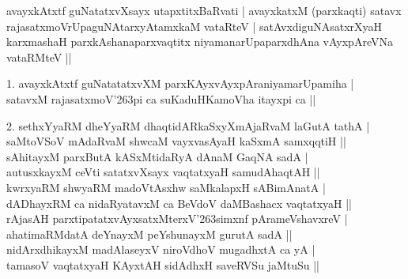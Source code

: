 \begin{entry}
\smallskip
\begin{shl}
avayxkAtxtf guNatatxvXsayx utapxtitxBaRvati | avayxkatxM (parxkaqti) satavx\\[1pt]
rajasatxmoVrUpaguNAtarxyAtamxkaM vataRteV | satAvxdiguNAsatxrXyaH\\[1pt]
karxmashaH parxkAshanaparxvaqtitx niyamanarUpaparxdhAna vAyxpAreVNa vataRMteV ||
\end{shl}
\smallskip
\begin{shl}
1. avayxkAtxtf guNatatatxvXM parxKAyxvAyxpAraniyamarUpamiha |\\[1pt]
satavxM rajasatxmoV\char'263pi ca suKaduHKamoVha itayxpi ca ||
\end{shl}
\medskip
{}
\smallskip
\begin{shl}
2. sethxYyaRM dheYyaRM dhaqtidARkaSxyXmAjaRvaM laGutA tathA |\\[2pt]
saMtoVSoV mAdaRvaM shwcaM vayxvasAyaH kaSxmA samxqqtiH ||\\[2pt]
sAhitayxM parxButA kASxMtidaRyA dAnaM GaqNA sadA |\\[2pt]
autusxkayxM ceVti satatxvXsayx vaqtatxyaH samudAhaqtAH ||\\[2pt]
kwrxyaRM shwyaRM madoVtAsxhw saMkalapxH sABimAnatA |\\[2pt]
dADhayxRM ca nidaRyatavxM ca BeVdoV daMBashacx vaqtatxyaH ||\\[2pt]
rAjasAH parxtipatatxvAyxsatxMterxV\char'263simxnf pArameVshavxreV |\\[2pt]
ahatimaRMdatA deYnayxM peYshunayxM gurutA sadA ||\\[2pt]
nidArxdhikayxM madAlaseyxV niroVdhoV mugadhxtA ca yA |\\[2pt]
tamasoV vaqtatxyaH KAyxtAH sidAdhxH saveRVSu jaMtuSu ||
\end{shl}
\medskip
{}
\end{entry}


